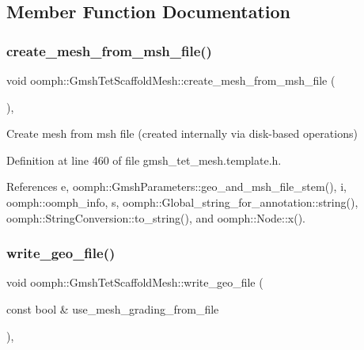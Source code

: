 \subsection{Member Function Documentation}
\mbox{\label{classoomph_1_1GmshTetScaffoldMesh_a13c5fa9a126fc1707534031826d8f43f}} 
\subsubsection{\texorpdfstring{create\+\_\+mesh\+\_\+from\+\_\+msh\+\_\+file()}{create\_mesh\_from\_msh\_file()}}
{\footnotesize\ttfamily void oomph\+::\+Gmsh\+Tet\+Scaffold\+Mesh\+::create\+\_\+mesh\+\_\+from\+\_\+msh\+\_\+file (\begin{DoxyParamCaption}{ }\end{DoxyParamCaption})\hspace{0.3cm}{\ttfamily [inline]}, {\ttfamily [private]}}



Create mesh from msh file (created internally via disk-\/based operations) 



Definition at line 460 of file gmsh\+\_\+tet\+\_\+mesh.\+template.\+h.



References e, oomph\+::\+Gmsh\+Parameters\+::geo\+\_\+and\+\_\+msh\+\_\+file\+\_\+stem(), i, oomph\+::oomph\+\_\+info, s, oomph\+::\+Global\+\_\+string\+\_\+for\+\_\+annotation\+::string(), oomph\+::\+String\+Conversion\+::to\+\_\+string(), and oomph\+::\+Node\+::x().

\mbox{\label{classoomph_1_1GmshTetScaffoldMesh_a20ba8fb06fe0264c4ba0b586b104f969}} 
\subsubsection{\texorpdfstring{write\+\_\+geo\+\_\+file()}{write\_geo\_file()}}
{\footnotesize\ttfamily void oomph\+::\+Gmsh\+Tet\+Scaffold\+Mesh\+::write\+\_\+geo\+\_\+file (\begin{DoxyParamCaption}\item[{const bool \&}]{use\+\_\+mesh\+\_\+grading\+\_\+from\+\_\+file }\end{DoxyParamCaption})\hspace{0.3cm}{\ttfamily [inline]}, {\ttfamily [private]}}



